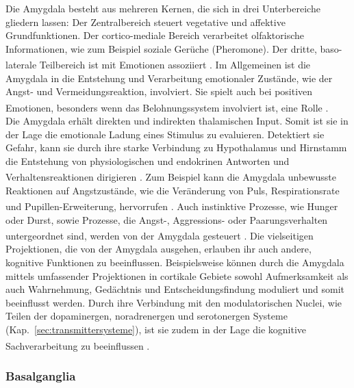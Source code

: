 \noindent Die Amygdala besteht aus mehreren Kernen, die sich in drei Unterbereiche gliedern lassen: Der Zentralbereich steuert vegetative und affektive Grundfunktionen. Der cortico-mediale Bereich verarbeitet olfaktorische Informationen, wie zum Beispiel soziale Gerüche (Pheromone). Der dritte, baso-laterale Teilbereich ist mit Emotionen assoziiert \textsuperscript{\cite[Kap.~6]{storch2012lehrbuchzoo}}. Im Allgemeinen ist die Amygdala in die Entstehung und Verarbeitung emotionaler Zustände, wie der Angst- und   Vermeidungsreaktion, involviert. Sie spielt auch bei positiven Emotionen, besonders wenn das Belohnungssystem involviert ist, eine Rolle \textsuperscript{\cite[Kap.~48]{kandel2013principles}}.\\
Die Amygdala erhält direkten und indirekten thalamischen Input. Somit ist sie in der Lage die emotionale Ladung eines Stimulus zu evaluieren. Detektiert sie Gefahr, kann sie durch ihre starke  Verbindung zu Hypothalamus und Hirnstamm die Entstehung von physiologischen und endokrinen Antworten und Verhaltensreaktionen dirigieren \textsuperscript{\cite[Kap.~48]{kandel2013principles}}. Zum Beispiel kann die Amygdala unbewusste Reaktionen auf Angstzustände, wie die Veränderung von Puls, Respirationsrate und Pupillen-Erweiterung,  hervorrufen \textsuperscript{\cite[Kap.~15]{kandel2013principles}}.
Auch instinktive Prozesse, wie Hunger oder Durst, sowie Prozesse, die Angst-, Aggressions- oder Paarungsverhalten untergeordnet sind, werden von der Amygdala gesteuert \textsuperscript{\cite[Kap.~18]{kandel2013principles}}.
Die vielseitigen Projektionen, die von der Amygdala ausgehen, erlauben ihr auch andere, kognitive Funktionen zu beeinflussen. Beispielsweise können durch die Amygdala mittels umfassender Projektionen in cortikale Gebiete sowohl Aufmerksamkeit als auch Wahrnehmung, Gedächtnis und Entscheidungsfindung moduliert und somit beeinflusst werden. Durch ihre Verbindung mit den modulatorischen Nuclei, wie Teilen der dopaminergen, noradrenergen und serotonergen Systeme (Kap.~\ref{sec:transmittersysteme}), ist sie zudem in der Lage die kognitive Sachverarbeitung zu beeinflussen \textsuperscript{\cite[Kap.~48]{kandel2013principles}}.

\subsubsection{Basalganglia}
\label{subsec:Basalganglia} 

